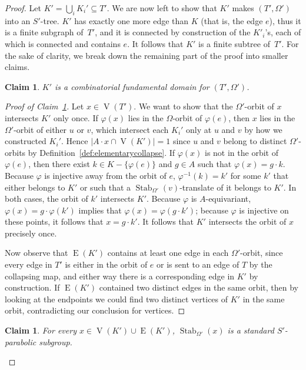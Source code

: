 \documentclass[svgnames]{amsart}
\theoremstyle{plain}
\newtheorem{claim}[thm]{Claim}
\theoremstyle{definition}
\newenvironment{claimproof}{\renewcommand{\qedsymbol}{$\blacksquare$}\begin{proof}}{\end{proof}}
\newcommand{\edge}[1]{\operatorname{E}(#1)}
\newcommand{\Stab}[2]{\operatorname{Stab}_{#1}\left(#2\right)}
\renewcommand{\phi}{\varphi}
\newcommand{\ver}[1]{\operatorname{V}(#1)}
\begin{document}
\begin{proof}
\noindent Let $K'=\bigcup_i K_i'\subseteq T'$. We are now left to show that $K'$ makes $(T',\Omega')$ into an $S'$-tree. $K'$ has exactly one more edge than $K$ (that is, the edge $e$), thus it is a finite subgraph of~$T'$, and it is connected by construction of the $K'_i$'s, each of which is connected and contains $e$. It follows that $K'$ is a finite subtree of~$T'$. For the sake of clarity, we break down the remaining part of the proof into smaller claims.

    \begin{claim}\label{claim:combdom}
        $K'$ is a combinatorial fundamental domain for $(T',\Omega')$.
    \end{claim}

    \begin{claimproof}[Proof of Claim~\ref{claim:combdom}]
Let $x\in\ver {T'}$. We want to show that the $\Omega'$-orbit of $x$ intersects $K'$ only once. If $\phi(x)$ lies in the $\Omega$-orbit of $\phi(e)$, then $x$ lies in the $\Omega'$-orbit of either $u$ or $v$, which intersect each $K_i'$ only at $u$ and $v$ by how we constructed $K_i'$. Hence $\lvert A\cdot x\cap\ver {K'}\rvert=1$ since $u$ and $v$ belong to distinct $\Omega'$-orbits by Definition~\ref{def:elementarycollapse}. If $\phi(x)$ is not in the orbit of $\phi(e)$, then there exist $k\in K-\{\phi(e)\}$ and $g\in A$ such that $\phi(x)=g\cdot k$. Because $\phi$ is injective away from the orbit of $e$, $\phi^{-1}(k)=k'$ for some $k'$ that either belongs to $K'$ or such that a $\Stab{\Omega'}{v}$-translate of it belongs to $K'$. In both cases, the orbit of $k'$ intersects $K'$. Because $\phi$ is $A$-equivariant, $\phi(x)=g\cdot\phi(k')$ implies that $\phi(x)=\phi(g\cdot k')$; because $\phi$ is injective on these points, it follows that $x=g\cdot k'$. It follows that $K'$ intersects the orbit of $x$ precisely once.  

    Now observe that $\edge{K'}$ contains at least one edge in each $\Omega'$-orbit, since every edge in $T'$ is either in the orbit of $e$ or is sent to an edge of $T$ by the collapsing map, and either way there is a corresponding edge in $K'$ by construction. If $\edge{K'}$ contained two distinct edges in the same orbit, then by looking at the endpoints we could find two distinct vertices of $K'$ in the same orbit, contradicting our conclusion for vertices.
\end{claimproof}
    

    \begin{claim}\label{claim:stab_S'}
        For every $x\in\ver {K'}\cup \edge {K'}$, $\Stab{\Omega'}{x}$ is a standard $S'$-parabolic subgroup.
    \end{claim}


\end{proof}
\end{document}
